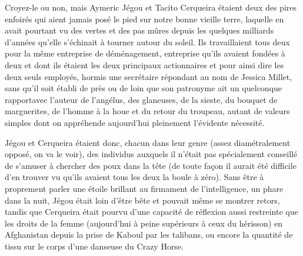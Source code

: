 %
Croyez-le ou non, mais Aymeric Jégou et Tacito Cerqueira étaient deux des pires enfoirés qui aient jamais posé le pied sur notre bonne vieille terre, laquelle en avait pourtant vu des vertes et des pas mûres depuis les quelques milliards d’années qu’elle s’échinait à tourner autour du soleil. Ils travaillaient tous deux pour la même entreprise de déménagement, entreprise qu’ils avaient fondées à deux et dont ils étaient les deux principaux actionnaires et pour ainsi dire les deux seuls employés, hormis une secrétaire répondant au nom de Jessica Millet, sans qu’il soit établi de près ou de loin que son patronyme ait un quelconque rapportavec l’auteur de l’angélus, des glaneuses, de la sieste, du bouquet de marguerites, de l’homme à la houe et du retour du troupeau, autant de valeurs simples dont on appréhende aujourd’hui pleinement l’évidente nécessité.

Jégou et Cerqueira étaient donc, chacun dans leur genre (assez diamétralement opposé, on va le voir), des individus auxquels il n’était pas spécialement conseillé de s’amuser à chercher des poux dans la tête (de toute façon il aurait été difficile d’en trouver vu qu’ils avaient tous les deux la boule à zéro). Sans être à proprement parler une étoile brillant au firmament de l’intelligence, un phare dans la nuit, Jégou était loin d’être bête et pouvait même se montrer retors, tandis que Cerqueira était pourvu d’une capacité de réflexion aussi restreinte que les droits de la femme (aujourd’hui à peine supérieurs à ceux du hérisson) en Afghanistan depuis la prise de Kaboul par les talibans, ou encore la quantité de tissu sur le corps d’une danseuse du Crazy Horse.

